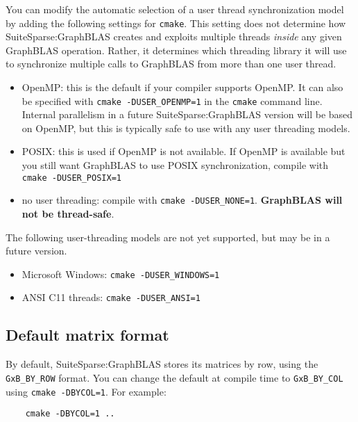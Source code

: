 \documentclass[12pt]{article}
\begin{document}
You can modify the automatic selection of a user thread synchronization model
by adding the following settings for \verb'cmake'.  This setting does not
determine how SuiteSparse:GraphBLAS creates and exploits multiple threads {\em
inside} any given GraphBLAS operation. Rather, it determines which threading
library it will use to synchronize multiple calls to GraphBLAS from more than
one user thread.

\begin{itemize}
\item OpenMP: this is the default if your compiler supports OpenMP.
    It can also be specified with \verb'cmake -DUSER_OPENMP=1' in the
    \verb'cmake' command line.  Internal parallelism in a future
    SuiteSparse:GraphBLAS version will be based on OpenMP, but this is
    typically safe to use with any user threading models.

\item POSIX: this is used if OpenMP is not available.
    If OpenMP is available but you still want GraphBLAS to use POSIX
    synchronization, compile with \verb'cmake -DUSER_POSIX=1'

\item no user threading:  compile with \verb'cmake -DUSER_NONE=1'.
    {\bf GraphBLAS will not be thread-safe}.

\end{itemize}

The following user-threading models are not yet supported, but may be in
a future version.

\begin{itemize}
\item Microsoft Windows:  \verb'cmake -DUSER_WINDOWS=1'
\item ANSI C11 threads:   \verb'cmake -DUSER_ANSI=1'
\end{itemize}

\subsection{Default matrix format}

By default, SuiteSparse:GraphBLAS stores its matrices by row, using the
\verb'GxB_BY_ROW' format.  You can change the default at compile time to
\verb'GxB_BY_COL' using \verb'cmake -DBYCOL=1'.  For example:

    {\small
    \begin{verbatim}
    cmake -DBYCOL=1 ..  \end{verbatim} }
\end{document}
